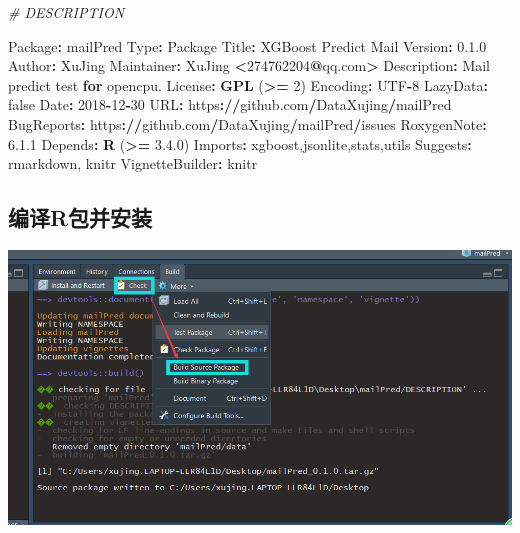 \documentclass[]{book}
\newenvironment{Shaded}{\begin{snugshade}}{\end{snugshade}}
\newcommand{\KeywordTok}[1]{\textcolor[rgb]{0.13,0.29,0.53}{\textbf{#1}}}
\newcommand{\DecValTok}[1]{\textcolor[rgb]{0.00,0.00,0.81}{#1}}
\newcommand{\FloatTok}[1]{\textcolor[rgb]{0.00,0.00,0.81}{#1}}
\newcommand{\StringTok}[1]{\textcolor[rgb]{0.31,0.60,0.02}{#1}}
\newcommand{\CommentTok}[1]{\textcolor[rgb]{0.56,0.35,0.01}{\textit{#1}}}
\newcommand{\ControlFlowTok}[1]{\textcolor[rgb]{0.13,0.29,0.53}{\textbf{#1}}}
\newcommand{\OperatorTok}[1]{\textcolor[rgb]{0.81,0.36,0.00}{\textbf{#1}}}
\newcommand{\ErrorTok}[1]{\textcolor[rgb]{0.64,0.00,0.00}{\textbf{#1}}}
\newcommand{\NormalTok}[1]{#1}
\begin{document}
\begin{Shaded}
\begin{Highlighting}[]
\CommentTok{# DESCRIPTION}

\NormalTok{Package}\OperatorTok{:}\StringTok{ }\NormalTok{mailPred}
\NormalTok{Type}\OperatorTok{:}\StringTok{ }\NormalTok{Package}
\NormalTok{Title}\OperatorTok{:}\StringTok{ }\NormalTok{XGBoost Predict Mail}
\NormalTok{Version}\OperatorTok{:}\StringTok{ }\FloatTok{0.1}\NormalTok{.}\DecValTok{0}
\NormalTok{Author}\OperatorTok{:}\StringTok{ }\NormalTok{XuJing}
\NormalTok{Maintainer}\OperatorTok{:}\StringTok{ }\NormalTok{XuJing }\OperatorTok{<}\DecValTok{274762204}\OperatorTok{@}\NormalTok{qq.com}\OperatorTok{>}
\NormalTok{Description}\OperatorTok{:}\StringTok{ }\NormalTok{Mail predict test }\ControlFlowTok{for}\NormalTok{ opencpu.}
\NormalTok{License}\OperatorTok{:}\StringTok{ }\KeywordTok{GPL}\NormalTok{ (}\OperatorTok{>=}\StringTok{ }\DecValTok{2}\NormalTok{)}
\NormalTok{Encoding}\OperatorTok{:}\StringTok{ }\NormalTok{UTF}\OperatorTok{-}\DecValTok{8}
\NormalTok{LazyData}\OperatorTok{:}\StringTok{ }\NormalTok{false}
\NormalTok{Date}\OperatorTok{:}\StringTok{ }\DecValTok{2018}\OperatorTok{-}\DecValTok{12}\OperatorTok{-}\DecValTok{30}
\NormalTok{URL}\OperatorTok{:}\StringTok{ }\NormalTok{https}\OperatorTok{:}\ErrorTok{//}\NormalTok{github.com}\OperatorTok{/}\NormalTok{DataXujing}\OperatorTok{/}\NormalTok{mailPred}
\NormalTok{BugReports}\OperatorTok{:}\StringTok{ }\NormalTok{https}\OperatorTok{:}\ErrorTok{//}\NormalTok{github.com}\OperatorTok{/}\NormalTok{DataXujing}\OperatorTok{/}\NormalTok{mailPred}\OperatorTok{/}\NormalTok{issues}
\NormalTok{RoxygenNote}\OperatorTok{:}\StringTok{ }\FloatTok{6.1}\NormalTok{.}\DecValTok{1}
\NormalTok{Depends}\OperatorTok{:}\StringTok{ }\KeywordTok{R}\NormalTok{ (}\OperatorTok{>=}\StringTok{ }\FloatTok{3.4}\NormalTok{.}\DecValTok{0}\NormalTok{)}
\NormalTok{Imports}\OperatorTok{:}\StringTok{ }\NormalTok{xgboost,jsonlite,stats,utils}
\NormalTok{Suggests}\OperatorTok{:}\StringTok{ }\NormalTok{rmarkdown, knitr}
\NormalTok{VignetteBuilder}\OperatorTok{:}\StringTok{ }\NormalTok{knitr}
\end{Highlighting}
\end{Shaded}

\subsection{编译R包并安装}\label{r}

\includegraphics{pic/opencpu/p13.png}
\end{document}
